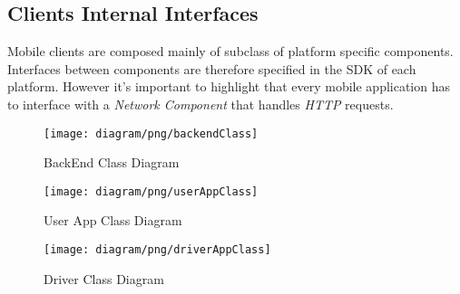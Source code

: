 \subsection{Clients Internal Interfaces}
\label{sub:back_end_interfaces}
Mobile clients are composed mainly of subclass of platform specific components.\\
Interfaces between components are therefore specified in the SDK of each platform.
However it's important to highlight that every mobile application has to interface with a \emph{Network Component} that handles \emph{HTTP} requests.\\

\newpage
\vfill
\begin{figure}[h!t]
\caption{BackEnd Class Diagram}
\texttt{[image: diagram/png/backendClass]}
\centering
\end{figure}
\vfill
\clearpage

\newpage
\vfill
\begin{figure}[h!t]
\caption{User App Class Diagram}
\texttt{[image: diagram/png/userAppClass]}
\centering
\end{figure}
\vfill
\clearpage


\newpage
\vfill
\begin{figure}[h!t]
\caption{Driver Class Diagram}
\texttt{[image: diagram/png/driverAppClass]}
\centering
\end{figure}
\vfill
\clearpage







